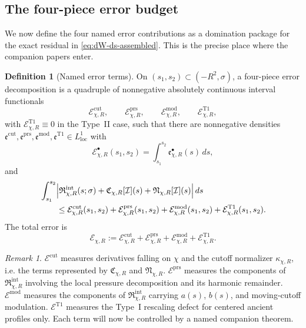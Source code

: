 \documentclass[11pt]{amsart}
\numberwithin{equation}{section}
\theoremstyle{plain}
\theoremstyle{definition}
\newtheorem{definition}[theorem]{Definition}
\theoremstyle{remark}
\newtheorem{remark}[theorem]{Remark}
\newcommand{\Err}{\mathcal E}
\newcommand{\kappachi}{\kappa_{\chi,R}}
\begin{document}
\subsection{The four-piece error budget}

We now define the four named error contributions as a domination package for
the exact residual in \eqref{eq:dW-ds-assembled}.  This is the precise place
where the companion papers enter.

\begin{definition}[Named error terms]
\label{def:errors}
On \((s_1,s_2)\subset(-R^2,\sigma)\), a four-piece error decomposition is a
quadruple of nonnegative absolutely continuous interval functionals
\[
	\Err^{\mathrm{cut}}_{\chi,R},\qquad
	\Err^{\mathrm{prs}}_{\chi,R},\qquad
	\Err^{\mathrm{mod}}_{\chi,R},\qquad
	\Err^{\mathrm{T1}}_{\chi,R},
\]
with \(\Err^{\mathrm{T1}}_{\chi,R}\equiv0\) in the Type~II case, such that
there are nonnegative densities
\(\mathfrak e^{\mathrm{cut}},\mathfrak e^{\mathrm{prs}},
\mathfrak e^{\mathrm{mod}},\mathfrak e^{\mathrm{T1}}\in L^1_{\mathrm{loc}}\)
with
\[
	\Err^\bullet_{\chi,R}(s_1,s_2)
	=\int_{s_1}^{s_2}\mathfrak e^\bullet_{\chi,R}(s)\,ds,
\]
and
\begin{equation}\label{eq:error-domination}
\begin{aligned}
	&\int_{s_1}^{s_2}
	\Bigl|
	\mathfrak R_{\chi,R}^{\mathrm{int}}(s;\sigma)
	+\mathfrak C_{\chi,R}[\mathcal I](s)
	+\mathfrak N_{\chi,R}[\mathcal I](s)
	\Bigr|\,ds\\
	&\qquad\le
	\Err^{\mathrm{cut}}_{\chi,R}(s_1,s_2)
	+\Err^{\mathrm{prs}}_{\chi,R}(s_1,s_2)
	+\Err^{\mathrm{mod}}_{\chi,R}(s_1,s_2)
	+\Err^{\mathrm{T1}}_{\chi,R}(s_1,s_2).
\end{aligned}
\end{equation}
The total error is
\[
	\Err_{\chi,R}:=\Err^{\mathrm{cut}}_{\chi,R}
	+\Err^{\mathrm{prs}}_{\chi,R}
	+\Err^{\mathrm{mod}}_{\chi,R}
	+\Err^{\mathrm{T1}}_{\chi,R}.
\]
\end{definition}

\begin{remark}\label{rem:err-interpretation}
\(\Err^{\mathrm{cut}}\) measures derivatives falling on \(\chi\) and the
cutoff normalizer \(\kappachi\), i.e. the terms represented by
\(\mathfrak C_{\chi,R}\) and \(\mathfrak N_{\chi,R}\).
\(\Err^{\mathrm{prs}}\) measures the components of
\(\mathfrak R_{\chi,R}^{\mathrm{int}}\) involving the local pressure
decomposition and its harmonic remainder.
\(\Err^{\mathrm{mod}}\) measures the components of
\(\mathfrak R_{\chi,R}^{\mathrm{int}}\) carrying \(a(s)\), \(b(s)\), and
moving-cutoff modulation.
\(\Err^{\mathrm{T1}}\) measures the Type~I rescaling defect for centered
ancient profiles only.  Each term will now be controlled by a named
companion theorem.
\end{remark}
\end{document}
